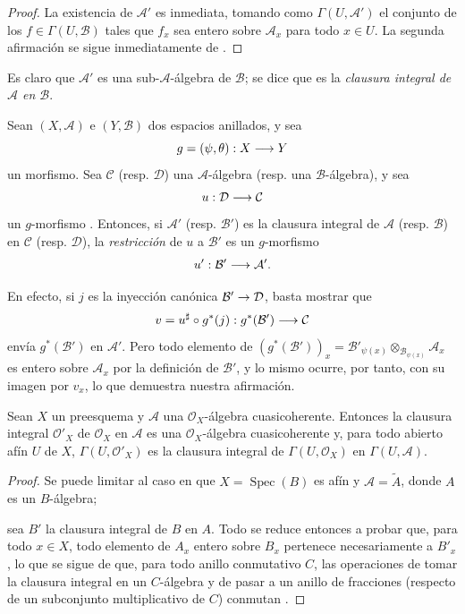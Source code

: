 \documentclass[oneside,10pt]{amsart}
\makeatletter
\newcommand{\ega@arrow}[2]{\mathchoice{#1}{#2}{#2}{#2}}
\renewcommand{\to}{\ega@arrow{\longrightarrow}{\rightarrow}}
\newcommand{\oldpage}[2][]{\marginnote{\normalfont\footnotesize\textbf{#1}~|~#2}\ignorespaces}
\let\EGAOriginalLabel\label
\renewcommand{\label}[1]{\phantomsection\EGAOriginalLabel{#1}}
\makeatother
\begin{document}
\begin{proof}
La existencia de $\mathcal{A}'$ es inmediata, tomando como $\Gamma(U,\mathcal{A}')$ el conjunto de los $f\in\Gamma(U,\mathcal{B})$ tales que $f_x$ sea entero sobre $\mathcal{A}_x$ para todo $x\in U$.
La segunda afirmación se sigue inmediatamente de .
\end{proof}

Es claro que $\mathcal{A}'$ es una sub-$\mathcal{A}$-álgebra de $\mathcal{B}$;
se dice que es la \emph{clausura integral de $\mathcal{A}$ en $\mathcal{B}$}.

\begin{env}[6.3.3]
\label{II.6.3.3-fr}
Sean $(X,\mathcal{A})$ e $(Y,\mathcal{B})$ dos espacios anillados, y sea
\[
g=(\psi,\theta):X\to Y
\]
un morfismo.
Sea $\mathcal{C}$ (resp. $\mathcal{D}$) una $\mathcal{A}$-álgebra (resp. una $\mathcal{B}$-álgebra), y sea
\[
u:\mathcal{D}\to\mathcal{C}
\]
un $g$-morfismo .
Entonces, si $\mathcal{A}'$ (resp. $\mathcal{B}'$) es la clausura integral de $\mathcal{A}$ (resp. $\mathcal{B}$) en $\mathcal{C}$ (resp. $\mathcal{D}$), la \emph{restricción} de $u$ a $\mathcal{B}'$ es un $g$-morfismo
\[
u':\mathcal{B}'\to\mathcal{A}'.
\]

En efecto, si $j$ es la inyección canónica $\mathcal{B}'\to\mathcal{D}$, basta mostrar que
\[
v=u^\sharp\circ g^*(j):g^*(\mathcal{B}')\to\mathcal{C}
\]
envía $g^*(\mathcal{B}')$ en $\mathcal{A}'$.
Pero todo elemento de $(g^*(\mathcal{B}'))_x=\mathcal{B}'_{\psi(x)}\otimes_{\mathcal{B}_{\psi(x)}}
\mathcal{A}_x$ es entero sobre $\mathcal{A}_x$ por la definición de $\mathcal{B}'$, y lo mismo ocurre, por tanto, con su imagen por $v_x$, lo que demuestra nuestra afirmación.
\end{env}

\begin{proposition}[6.3.4]
\label{II.6.3.4-fr}
Sean $X$ un preesquema y $\mathcal{A}$ una $\mathcal{O}_X$-álgebra cuasicoherente.
Entonces la clausura integral $\mathcal{O}'_X$ de $\mathcal{O}_X$ en $\mathcal{A}$ es una $\mathcal{O}_X$-álgebra cuasicoherente y, para todo abierto afín $U$ de $X$, $\Gamma(U,\mathcal{O}'_X)$ es la clausura integral de $\Gamma(U,\mathcal{O}_X)$ en $\Gamma(U,\mathcal{A})$.
\end{proposition}

\begin{proof}
Se puede limitar al caso en que $X=\operatorname{Spec}(B)$ es afín y $\mathcal{A}=\widetilde{A}$, donde $A$ es un
\oldpage[II]{118}
 $B$-álgebra;

sea $B'$ la clausura integral de $B$ en $A$.
Todo se reduce entonces a probar que, para todo $x\in X$, todo elemento de $A_x$ entero sobre $B_x$ pertenece necesariamente a $B'_x$, lo que se sigue de que, para todo anillo conmutativo $C$, las operaciones de tomar la clausura integral en un $C$-álgebra y de pasar a un anillo de fracciones (respecto de un subconjunto multiplicativo de $C$) conmutan \cite[t.~I, pp.~261 y 257]{I-13}.
\end{proof}
\end{document}

